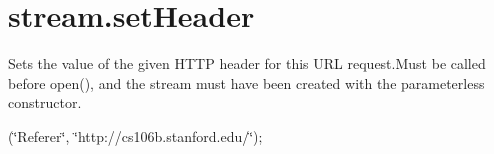 \hypertarget{stream_8setHeader-example}{}\section{stream.\+set\+Header}
Sets the value of the given H\+T\+TP header for this U\+RL request.\+Must be called before open(), and the stream must have been created with the parameterless constructor.

(\char`\"{}\+Referer\char`\"{}, \char`\"{}http\+://cs106b.\+stanford.\+edu/\char`\"{});


\begin{DoxyCodeInclude}
\end{DoxyCodeInclude}
 